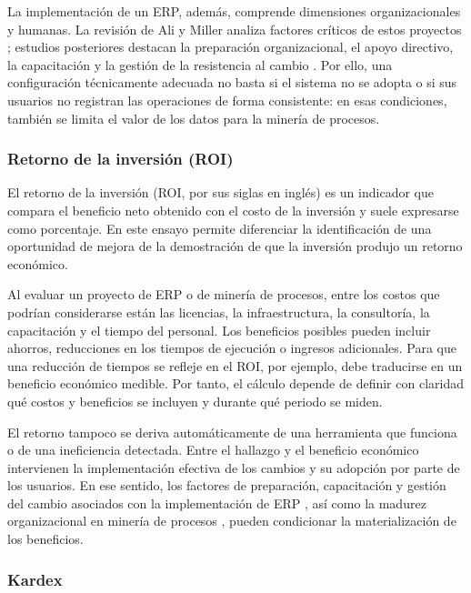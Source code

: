 \documentclass{article}
\begin{document}
    La implementación de un ERP, además, comprende dimensiones organizacionales y humanas. La revisión de Ali y Miller analiza factores críticos de estos proyectos \cite{alimiller2017erp}; estudios posteriores destacan la preparación organizacional, el apoyo directivo, la capacitación y la gestión de la resistencia al cambio \cite{talo2025erp}. Por ello, una configuración técnicamente adecuada no basta si el sistema no se adopta o si sus usuarios no registran las operaciones de forma consistente: en esas condiciones, también se limita el valor de los datos para la minería de procesos.

    \subsubsection{Retorno de la inversión (ROI)}

    El retorno de la inversión (ROI, por sus siglas en inglés) es un indicador que compara el beneficio neto obtenido con el costo de la inversión y suele expresarse como porcentaje. En este ensayo permite diferenciar la identificación de una oportunidad de mejora de la demostración de que la inversión produjo un retorno económico.

    Al evaluar un proyecto de ERP o de minería de procesos, entre los costos que podrían considerarse están las licencias, la infraestructura, la consultoría, la capacitación y el tiempo del personal. Los beneficios posibles pueden incluir ahorros, reducciones en los tiempos de ejecución o ingresos adicionales. Para que una reducción de tiempos se refleje en el ROI, por ejemplo, debe traducirse en un beneficio económico medible. Por tanto, el cálculo depende de definir con claridad qué costos y beneficios se incluyen y durante qué periodo se miden.

    El retorno tampoco se deriva automáticamente de una herramienta que funciona o de una ineficiencia detectada. Entre el hallazgo y el beneficio económico intervienen la implementación efectiva de los cambios y su adopción por parte de los usuarios. En ese sentido, los factores de preparación, capacitación y gestión del cambio asociados con la implementación de ERP \cite{talo2025erp}, así como la madurez organizacional en minería de procesos \cite{processminingmaturity2024}, pueden condicionar la materialización de los beneficios.

    \subsubsection{Kardex}
\end{document}
